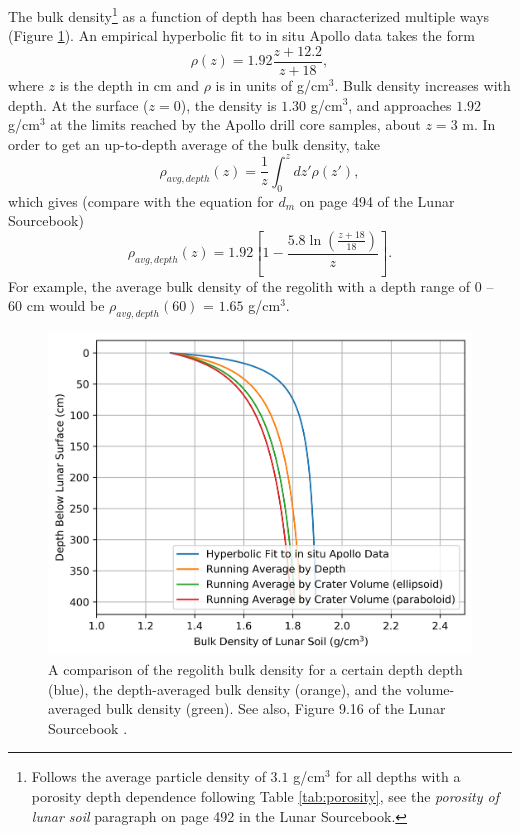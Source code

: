 \documentclass{article}
\begin{document}
The bulk density\footnote{Follows the average particle density of $3.1$ g/cm$^3$ for all depths with a porosity depth dependence following Table \ref{tab:porosity}, see the \textit{porosity of lunar soil} paragraph on page 492 in the Lunar Sourcebook.} as a function of depth has been characterized multiple ways (Figure \ref{fig:regolith_density_vs_depth}). An empirical hyperbolic fit to in situ Apollo data takes the form
\begin{equation}\label{eq:regolith density vs depth}
\rho(z) = 1.92\frac{z+12.2}{z+18},
\end{equation}
where $z$ is the depth in cm and $\rho$ is in units of g/cm$^3$. Bulk density increases with depth. At the surface ($z=0$), the density is $1.30$ g/cm$^3$, and approaches $1.92$ g/cm$^3$ at the limits reached by the Apollo drill core samples, about $z=3$ m. In order to get an up-to-depth average of the bulk density, take
\begin{equation}
\rho_{avg, depth}(z) = \frac{1}{z}\int_{0}^{z}dz'\rho(z'), 
\end{equation}
which gives (compare with the equation for $d_m$ on page 494 of the Lunar Sourcebook)
\begin{equation}\label{eq:density depth averaged}
\rho_{avg, depth}(z) = 1.92\left[1 - \frac{5.8\ln\left(\frac{z + 18}{18}\right)}{z}\right].
\end{equation}
For example, the average bulk density of the regolith with a depth range of $0$ -- $60$ cm would be $\rho_{avg, depth}(60)$ = $1.65$ g/cm$^3$.



\begin{figure}[!htb]
	\centering
	\includegraphics[width=\linewidth]{regolith_density_vs_depth.png}
	\caption{A comparison of the regolith bulk density for a certain depth depth (blue), the depth-averaged bulk density (orange), and the volume-averaged bulk density (green). See also, Figure 9.16 of the Lunar Sourcebook \citep{heiken1991lunar}.}
	\label{fig:regolith_density_vs_depth}
\end{figure}
\end{document}
